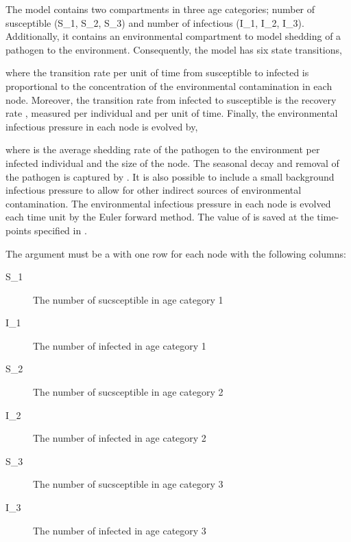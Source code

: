 \documentclass[letterpaper]{book}
\begin{document}
\begin{Details}
The  model contains two compartments in three age
categories; number of susceptible (S\_1, S\_2, S\_3) and number of
infectious (I\_1, I\_2, I\_3). Additionally, it contains an
environmental compartment to model shedding of a pathogen to the
environment. Consequently, the model has six state transitions,







where the transition rate per unit of time from susceptible to
infected is proportional to the concentration of the environmental
contamination \eqn{\varphi}{} in each node. Moreover, the
transition rate from infected to susceptible is the recovery rate
, measured per individual and
per unit of time. Finally, the environmental infectious pressure
in each node is evolved by,


where \eqn{\alpha}{} is the average shedding rate of the pathogen to
the environment per infected individual and  the size of the node. The seasonal decay
and removal of the pathogen is captured by . It is
also possible to include a small background infectious pressure
\eqn{\epsilon}{} to allow for other indirect sources of
environmental contamination. The environmental infectious pressure
 in each node is evolved each time unit by
the Euler forward method. The value of  is
saved at the time-points specified in .

The argument  must be a  with one row for
each node with the following columns:
\begin{description}

\item[S\_1] The number of sucsceptible in age category 1
\item[I\_1] The number of infected in age category 1
\item[S\_2] The number of sucsceptible in age category 2
\item[I\_2] The number of infected in age category 2
\item[S\_3] The number of sucsceptible in age category 3
\item[I\_3] The number of infected in age category 3

\end{description}

\end{Details}
\end{document}
